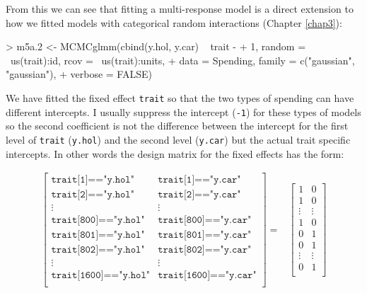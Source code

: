 \documentclass{article}
\begin{document}
From this we can see that fitting a multi-response model is a direct extension to how we fitted models with categorical random interactions (Chapter \ref{chap3}):

\begin{Schunk}
\begin{Sinput}
> m5a.2 <- MCMCglmm(cbind(y.hol, y.car) ~ trait - 
+     1, random = ~us(trait):id, rcov = ~us(trait):units, 
+     data = Spending, family = c("gaussian", "gaussian"), 
+     verbose = FALSE)
\end{Sinput}
\end{Schunk}

We have fitted the fixed effect \texttt{trait} so that the two types of spending can have different intercepts. I usually suppress the intercept (\texttt{-1}) for these types of models so the second coefficient is not the difference between the intercept for the first level of \texttt{trait} (\texttt{y.hol}) and the second level (\texttt{y.car}) but the actual trait specific intercepts. In other words the design matrix for the fixed effects has the form:

\begin{displaymath}
\begin{array}{rl}
\left[
\begin{array}{cc}
\texttt{trait[1]=="y.hol"}&\texttt{trait[1]=="y.car"}\\
\texttt{trait[2]=="y.hol"}&\texttt{trait[2]=="y.car"}\\
\vdots&\vdots\\
\texttt{trait[800]=="y.hol"}&\texttt{trait[800]=="y.car"}\\
\texttt{trait[801]=="y.hol"}&\texttt{trait[801]=="y.car"}\\
\texttt{trait[802]=="y.hol"}&\texttt{trait[802]=="y.car"}\\
\vdots&\vdots\\
\texttt{trait[1600]=="y.hol"}&\texttt{trait[1600]=="y.car"}\\
\end{array}
\right]
=&
\left[
\begin{array}{cc}
1&0\\
1&0\\
\vdots&\vdots\\
1&0\\
0&1\\
0&1\\
\vdots&\vdots\\
0&1\\
\end{array}
\right]\\
\end{array}
\end{displaymath}
\end{document}
